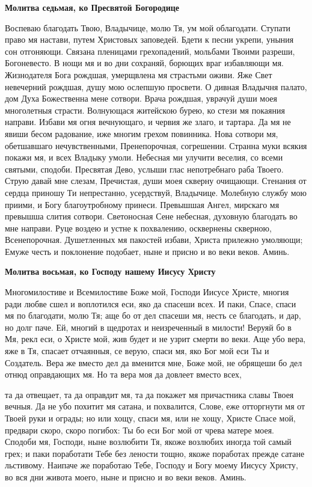  

\bfseries Молитва седьмая, ко Пресвятой Богородице\normalfont{}


   Воспеваю благодать Твою, Владычице, молю Тя, ум мой облагодати.
Ступати право мя настави, путем Христовых заповедей. Бдети к песни
укрепи, уныния сон отгоняющи. Связана пленицами грехопадений, мольбами
Твоими разреши, Богоневесто. В нощи мя и во дни сохраняй, борющих враг
избавляющи мя. Жизнодателя Бога рождшая, умерщвлена мя страстьми
оживи. Яже Свет невечерний рождшая, душу мою ослепшую просвети. О
дивная Владычня палато, дом Духа Божественна мене сотвори. Врача
рождшая, уврачуй души моея многолетныя страсти. Волнующася
житейскою бурею, ко стези мя покаяния направи. Избави мя огня
вечнующаго, и червия же злаго, и тартара. Да мя не явиши бесом
радование, иже многим грехом повинника. Нова сотвори мя, обетшавшаго
нечувственными, Пренепорочная, согрешении. Странна муки всякия покажи
мя, и всех Владыку умоли. Небесная ми улучити веселия, со всеми
святыми, сподоби. Пресвятая Дево, услыши глас непотребнаго раба
Твоего. Струю давай мне слезам, Пречистая, души моея скверну
очищающи. Стенания от сердца приношу Ти непрестанно, усердствуй,
Владычице. Молебную службу мою приими, и Богу благоутробному
принеси. Превышшая Ангел, мирскаго мя превышша слития сотвори.
Светоносная Сене небесная, духовную благодать во мне направи. Руце
воздею и устне к похвалению, осквернены скверною, Всенепорочная.
Душетленных мя пакостей избави, Христа прилежно умоляющи;
Емуже честь и поклонение подобает, ныне и присно и во веки веков.
Аминь.



 

\bfseries Молитва восьмая, ко Господу нашему Иисусу Христу\normalfont{}


   Многомилостиве и Всемилостиве Боже мой, Господи Иисусе Христе,
многия ради любве сшел и воплотился еси, яко да спасеши всех. И паки,
Спасе, спаси мя по благодати, молю Тя; аще бо от дел спасеши мя,
несть се благодать, и дар, но долг паче. Ей, многий в щедротах и
неизреченный в милости! Веруяй бо в Мя, рекл еси, о Христе мой, жив
будет и не узрит смерти во веки. Аще убо вера, яже в Тя, спасает
отчаянныя, се верую, спаси мя, яко Бог мой еси Ты и Создатель.
Вера же вместо дел да вменится мне, Боже мой, не обрящеши бо
дел отнюд оправдающих мя. Но та вера моя да довлеет вместо всех,

та да отвещает, та да оправдит мя, та да покажет мя причастника
славы Твоея вечныя. Да не убо похитит мя сатана, и похвалится,
Слове, еже отторгнути мя от Твоей руки и ограды; но или хощу,
спаси мя, или не хощу, Христе Спасе мой, предвари скоро, скоро
погибох: Ты бо еси Бог мой от чрева матере моея. Сподоби мя, Господи,
ныне возлюбити Тя, якоже возлюбих иногда той самый грех; и паки
поработати Тебе без лености тощно, якоже поработах прежде сатане
льстивому. Наипаче же поработаю Тебе, Господу и Богу моему Иисусу
Христу, во вся дни живота моего, ныне и присно и во веки веков.
Аминь.



